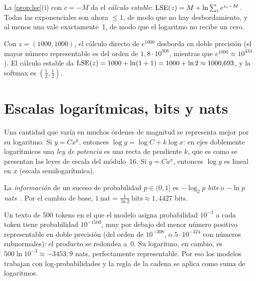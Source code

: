 La \cref{prop:lse}(i) con $c=-M$ da el \emph{cálculo estable}: $\operatorname{LSE}(z)=M+\ln\sum_ie^{z_i-M}$. Todas las exponenciales son ahora $\le1$, de modo que no hay desbordamiento, y al menos una vale exactamente~1, de modo que el logaritmo no recibe un cero.

\begin{ejemplo}\label{ej:lse-estable}
Con $z=(1000,1000)$, el cálculo directo de $e^{1000}$ desborda en doble precisión (el mayor número representable es del orden de $1{,}8\cdot10^{308}$, mientras que $e^{1000}\approx10^{434}$). El cálculo estable da $\operatorname{LSE}(z)=1000+\ln(1+1)=1000+\ln2\approx1000{,}693$, y la softmax es $(\frac12,\frac12)$.
\end{ejemplo}

\section{Escalas logarítmicas, bits y nats}

Una cantidad que varía en muchos órdenes de magnitud se representa mejor por su logaritmo. Si $y=Cx^{k}$, entonces $\log y=\log C+k\log x$: en ejes doblemente logarítmicos una \emph{ley de potencia} es una recta de pendiente $k$, que es como se presentan las leyes de escala del módulo~16. Si $y=Ca^{x}$, entonces $\log y$ es lineal en $x$ (escala semilogarítmica).

\begin{definicion}
La \emph{información} de un suceso de probabilidad $p\in(0,1]$ es $-\log_2p$ \emph{bits} o $-\ln p$ \emph{nats}~\cite[cap.~2]{ct}. Por el cambio de base, $1\ \text{nat}=\frac1{\ln2}\ \text{bits}\approx1{,}4427$ bits.
\end{definicion}

\begin{ejemplo}\label{ej:underflow}
Un texto de 500 tokens en el que el modelo asigna probabilidad $10^{-3}$ a cada token tiene probabilidad $10^{-1500}$, muy por debajo del menor número positivo representable en doble precisión (del orden de $10^{-308}$, o $5\cdot10^{-324}$ con números subnormales): el producto se redondea a~0. Su logaritmo, en cambio, es $500\ln10^{-3}\approx-3453{,}9$ nats, perfectamente representable. Por eso los modelos trabajan con log-probabilidades y la regla de la cadena se aplica como suma de logaritmos.
\end{ejemplo}

